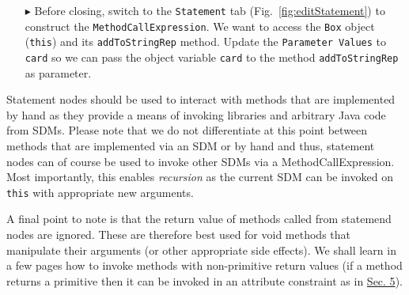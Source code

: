 \begin{itemize}
\item[$\blacktriangleright$] Before closing, switch to the \texttt{Statement} tab (Fig.~\ref{fig:editStatement}) to construct the \texttt{MethodCallExpression}.
We want to access the \texttt{Box} object (\texttt{this}) and its \texttt{addToStringRep} method. Update the \texttt{Parameter Values} to \texttt{card} so we
can pass the object variable \texttt{card} to the method \texttt{addToStringRep} as parameter.

\vspace{0.5cm}

\begin{figure}[htbp]
   \centering
      \caption{}
\end{figure}
\FloatBarrier

\end{itemize}

Statement nodes should be used to interact with methods that are implemented by hand as they provide a means of invoking libraries and arbitrary Java code from
SDMs. Please note that we do not differentiate at this point between methods that are implemented via an SDM or by hand and thus, statement nodes can of course
be used to invoke other SDMs via a MethodCallExpression. Most importantly, this enables \emph{recursion} as the current SDM can be invoked on \texttt{this} with
appropriate new arguments.

A final point to note is that the return value of methods called from statemend nodes are ignored. These are therefore best used for void methods that
manipulate their arguments (or other appropriate side effects). We shall learn in a few pages how to invoke methods with non-primitive return values (if a
method returns a primitive then it can be invoked in an attribute constraint as in \hyperlink{sec:growBox}{Sec. 5}).

